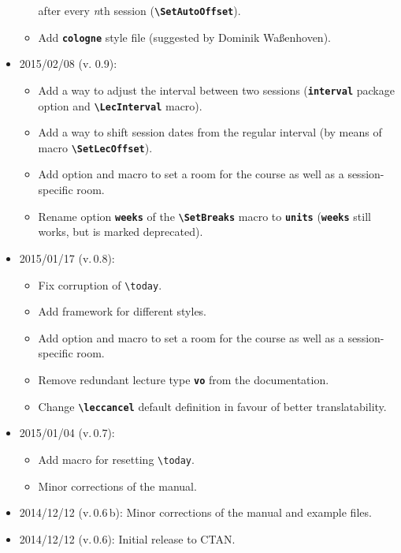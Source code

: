 \documentclass[english]{article}
\newcommand*\jmacro[1]{\textbf{\texttt{#1}}}
\newcommand*\jcsmacro[1]{\jmacro{\textbackslash{#1}}}
\newcommand*\joption[1]{\textbf{\texttt{#1}}}
\newcommand*\jfmacro[1]{\texttt{#1}}
\newcommand*\jfcsmacro[1]{\jfmacro{\textbackslash{#1}}}
\begin{document}
\begin{itemize}
\begin{itemize}
             after every \emph{n}th session (\jcsmacro{SetAutoOffset}).
       \item Add \joption{cologne} style file (suggested by Dominik Waßenhoven).
    \end{itemize}
\item 2015/02/08 (v. 0.9):
     \begin{itemize}
       \item Add a way to adjust the interval between two sessions
             (\joption{interval} package option and \jcsmacro{LecInterval} macro).
       \item Add a way to shift session dates from the regular interval
             (by means of macro \jcsmacro{SetLecOffset}).
       \item Add option and macro to set a room for the course as well as
             a session-specific room.
       \item Rename option \joption{weeks} of the \jcsmacro{SetBreaks} macro
             to \joption{units} (\joption{weeks} still works, but is marked deprecated).
    \end{itemize} 
\item 2015/01/17 (v.\,0.8):
    \begin{itemize}
       \item Fix corruption of \jfcsmacro{today}.
       \item Add framework for different styles.
       \item Add option and macro to set a room for the course as well as
             a session-specific room.
       \item Remove redundant lecture type \joption{vo} from the documentation.
       \item Change \jcsmacro{leccancel} default definition in favour of better
             translatability.
    \end{itemize}\filbreak
\item 2015/01/04 (v.\,0.7):
    \begin{itemize}
       \item Add macro for resetting \jfcsmacro{today}.
       \item Minor corrections of the manual.
    \end{itemize}
\item 2014/12/12 (v.\,0.6\,b): Minor corrections of the manual and example files.
\item 2014/12/12 (v.\,0.6): Initial release to CTAN.
\end{itemize}
\end{document}
